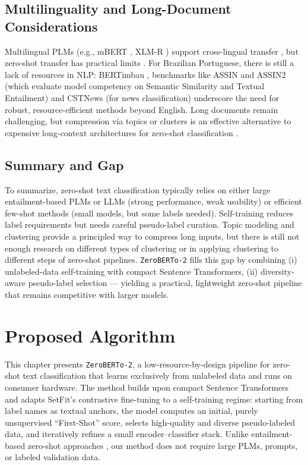 \documentclass[]{politex-xico}
\begin{document}
\section{Multilinguality and Long-Document Considerations}
\label{sec:multilingual_long}

Multilingual PLMs (e.g., mBERT \cite{multilingualbert}, XLM-R \cite{DBLP:journals/corr/abs-1911-02116}) support cross-lingual transfer \cite{conneau2020unsupervised}, but zero-shot transfer has practical limits \cite{lauscher-etal-2020-zero}. For Brazilian Portuguese, there is still a lack of resources in NLP: BERTimbau \cite{souza2020bertimbau}, benchmarks like ASSIN and ASSIN2 (which evaluate model competency on Semantic Similarity and Textual Entailment) \cite{fonseca2016assin,real2020assin} and CSTNews (for news classification) \cite{cardoso2011cstnews} underscore the need for robust, resource-efficient methods beyond English. Long documents remain challenging, but compression via topics or clusters is an effective alternative to expensive long-context architectures for zero-shot classification \cite{alcoforado2022zeroberto}.

\section{Summary and Gap}
\label{sec:review_summary}

To summarize, zero-shot text classification typically relies on either large entailment-based PLMs or LLMs (strong performance, weak usability) or efficient few-shot methods (small models, but some labels needed). Self-training reduces label requirements but needs careful pseudo-label curation. Topic modeling and clustering provide a principled way to compress long inputs, but there is still not enough research on different types of clustering or in applying clustering to different steps of zero-shot pipelines. \texttt{ZeroBERTo-2} fills this gap by combining (i) unlabeled-data self-training with compact Sentence Transformers, (ii) diversity-aware pseudo-label selection — yielding a practical, lightweight zero-shot pipeline that remains competitive with larger models.

\chapter{Proposed Algorithm}
\label{chapter_zeroberto2}

This chapter presents \texttt{ZeroBERTo-2}, a low-resource-by-design pipeline for zero-shot text classification that learns exclusively from unlabeled data and runs on consumer hardware. The method builds upon compact Sentence Transformers and adapts SetFit’s contrastive fine-tuning \cite{setfit} to a self-training regime: starting from label names as textual anchors, the model computes an initial, purely unsupervised “First-Shot” score, selects high-quality and diverse pseudo-labeled data, and iteratively refines a small encoder–classifier stack. Unlike entailment-based zero-shot approaches \cite{yin2019benchmarking}, our method does not require large PLMs, prompts, or labeled validation data. 
\end{document}
